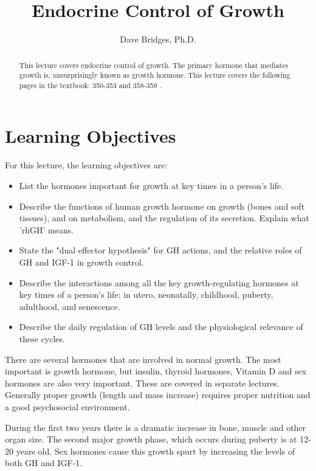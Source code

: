 \documentclass{tufte-handout}
\title{Endocrine Control of Growth}
\author{Dave Bridges, Ph.D.}
\begin{document}
\maketitle%

\begin{abstract}
\noindent This lecture covers endocrine control of growth.  The primary hormone that mediates growth is, unsurprisingly known as growth hormone.  This lecture covers the following pages in the textbook: 350-353 and 358-359 \cite{Widmaier2013}.
\end{abstract}

\tableofcontents

\pagebreak

\section{Learning Objectives}
For this lecture, the learning objectives are:
\begin{itemize}
\item List the hormones important for growth at key times in a person's life.
\item Describe the functions of human growth hormone on growth (bones and soft tissues), and on metabolism, and the regulation of its secretion.  Explain what 'rhGH' means.
\item State the "dual effector hypothesis" for GH actions, and the relative roles of GH and IGF-1 in growth control. 
\item Describe the interactions among all the key growth-regulating hormones at key times of a person's life: in utero, neonatally, childhood, puberty, adulthood, and senescence.
\item Describe the daily regulation of GH levels and the physiological relevance of these cycles.

\end{itemize}

There are several hormones that are involved in normal growth.  The most important is growth hormone, but insulin, thyroid hormones, Vitamin D and sex hormones are also very important.  These are covered in separate lectures.  Generally proper growth (length and mass increase) requires proper nutrition and a good psychosocial environment.   

  During the first two years there is a dramatic increase in bone, muscle and other organ size.  The second major growth phase, which occurs during puberty is at 12-20 years old.  Sex hormones cause this growth spurt by increasing the levels of both GH and IGF-1.
\end{document}
